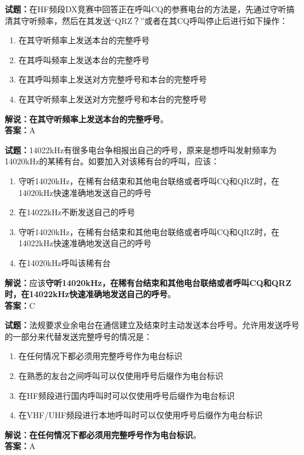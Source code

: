 \documentclass{ctexbook}
\begin{document}
\vspace{\baselineskip}

\noindent\textbf{试题：}在HF频段DX竞赛中回答正在呼叫CQ的参赛电台的方法是，先通过守听搞清其守听频率，然后在其发送“QRZ？”或者在其CQ呼叫停止后进行如下操作：
\begin{enumerate}[leftmargin=3em]
  \item 在其守听频率上发送本台的完整呼号
  \item 在其呼叫频率上发送本台的完整呼号
  \item 在其呼叫频率上发送对方完整呼号和本台的完整呼号
  \item 在其守听频率上发送对方完整呼号和本台的完整呼号
\end{enumerate}
\noindent\textbf{解说：}\textbf{在其守听频率上发送本台的完整呼号}。\\\noindent\textbf{答案：}A

\vspace{\baselineskip}

\noindent\textbf{试题：}14022\si{\kHz}有很多电台争相报出自己的呼号，原来是想呼叫发射频率为14020\si{\kHz}的某稀有台。如要加入对该稀有台的呼叫，应该：
\begin{enumerate}[leftmargin=3em]
  \item 守听14020\si{\kHz}，在稀有台结束和其他电台联络或者呼叫CQ和QRZ时，在14020\si{\kHz}快速准确地发送自己的呼号
  \item 在14022\si{\kHz}不断发送自己的呼号
  \item 守听14020\si{\kHz}，在稀有台结束和其他电台联络或者呼叫CQ和QRZ时，在14022\si{\kHz}快速准确地发送自己的呼号
  \item 在14020\si{\kHz}呼叫该稀有台
\end{enumerate}
\noindent\textbf{解说：}应该\textbf{守听14020\si{\kHz}，在稀有台结束和其他电台联络或者呼叫CQ和QRZ时，在14022\si{\kHz}快速准确地发送自己的呼号}。\\\noindent\textbf{答案：}C

\vspace{\baselineskip}

\noindent\textbf{试题：}法规要求业余电台在通信建立及结束时主动发送本台呼号。允许用发送呼号的一部分来代替发送完整呼号的情况是：
\begin{enumerate}[leftmargin=3em]
  \item 在任何情况下都必须用完整呼号作为电台标识
  \item 在熟悉的友台之间呼叫可以仅使用呼号后缀作为电台标识
  \item 在HF频段进行国内呼叫时可以仅使用呼号后缀作为电台标识
  \item 在VHF/UHF频段进行本地呼叫时可以仅使用呼号后缀作为电台标识
\end{enumerate}
\noindent\textbf{解说：}\textbf{在任何情况下都必须用完整呼号作为电台标识}。\\\noindent\textbf{答案：}A
\end{document}
